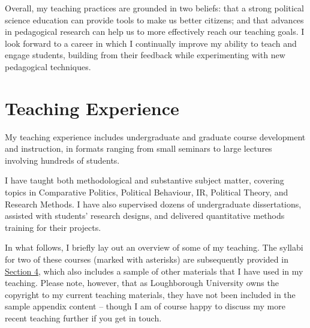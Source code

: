 \documentclass[11pt]{article}
\begin{document}
Overall, my teaching practices are grounded in two beliefs: that a strong political science education can provide tools to make us better citizens; and that advances in pedagogical research can help us to more effectively reach our teaching goals. I look forward to a career in which I continually improve my ability to teach and engage students, building from their feedback while experimenting with new pedagogical techniques. 

\section{ Teaching Experience}

My teaching experience includes undergraduate and graduate course development and instruction, in formats ranging from small seminars to large lectures involving hundreds of students. 

I have taught both methodological and substantive subject matter, covering topics in Comparative Politics, Political Behaviour, IR, Political Theory, and Research Methods. I have also supervised dozens of undergraduate dissertations, assisted with students' research designs, and delivered quantitative methods training for their projects. 

In what follows, I briefly lay out an overview of some of my teaching. The syllabi for two of these courses (marked with asterisks) are subsequently provided in \hyperref[sec:materials]{Section 4}, which also includes a sample of other materials that I have used in my teaching. Please note, however, that as Loughborough University owns the copyright to my current teaching materials, they have not been included in the sample appendix content -- though I am of course happy to discuss my more recent teaching further if you get in touch. 
\end{document}
